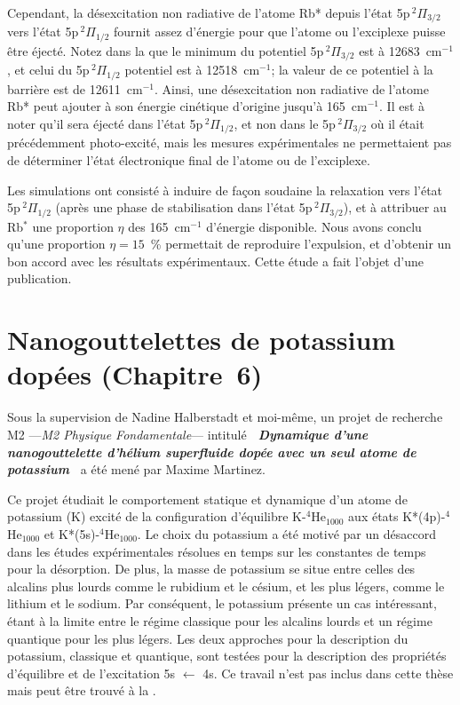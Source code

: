 		Cependant,  la désexcitation non radiative de l'atome Rb*  depuis l'état 5p$\,^2\Pi_{3/2}$ vers l'état 5p$\,^2\Pi_{1/2}$ fournit assez d'énergie pour que l'atome ou l'exciplexe puisse être éjecté. 
		Notez dans la  que le minimum du potentiel 5p$\,^2\Pi_{3/2}$ est à 12683~cm$^{-1}$, et celui du 5p$\,^2\Pi_{1/2}$ potentiel est à 12518~cm$^{-1}$; la valeur de ce potentiel à la barrière est de 12611~cm$^{-1}$. 
		Ainsi, une désexcitation non radiative de l'atome Rb* peut ajouter à son énergie cinétique d'origine jusqu'à 165~cm$^{-1}$. 
		Il est à noter qu'il sera éjecté dans l'état 5p$\,^2\Pi_{1/2}$, et non dans le 5p$\,^2\Pi_{3/2}$ où il était précédemment photo-excité, mais les mesures expérimentales ne permettaient pas de déterminer l'état électronique final de l'atome ou de l'exciplexe.
		
		Les simulations ont consisté à induire de façon soudaine la relaxation vers l'état 5p$\,^2\Pi_{1/2}$ (après une phase de stabilisation dans l'état 5p$\,^2\Pi_{3/2}$), et à attribuer au Rb$^*$ une proportion $\eta$ des 165~cm$^{-1}$ d'énergie disponible.
		Nous avons conclu qu'une proportion $\eta=15$~\% permettait de reproduire l'expulsion, et d'obtenir un bon accord avec les résultats expérimentaux.
		Cette étude a fait l'objet d'une publication.

	\section*{Nanogouttelettes de potassium dopées \small{(Chapitre~6)}}
		Sous la supervision de Nadine Halberstadt et moi-même, un projet de recherche M2  ---\emph{M2 Physique Fondamentale}--- intitulé \emph{\textbf{\guillemotleft~Dynamique d'une nanogouttelette d'hélium superfluide dopée avec un seul atome de potassium~\guillemotright}} a été mené par Maxime Martinez.
		
		Ce projet étudiait le comportement statique et dynamique d'un atome de potassium (K) excité de la configuration d'équilibre K-$^4$He$_{1000}$ aux états K*(4p)-$^4$He$_{1000}$ et K*(5s)-$^4$He$_{1000}$. 
		Le choix du potassium a été motivé par un désaccord dans les études expérimentales résolues en temps\citep{Schulz2001,Reho2000-1,Reho2000-2} sur les constantes de temps pour la désorption. 
		De plus, la masse de potassium se situe entre celles des alcalins plus lourds comme le rubidium et le césium, et les plus légers, comme le lithium et le sodium. 
		Par conséquent, le potassium présente un cas intéressant, étant à la limite entre le régime classique pour les alcalins lourds et un régime quantique pour les plus légers. 
		Les deux approches pour la description du potassium, classique et quantique, sont testées pour la description des propriétés d'équilibre et de l'excitation 5s $\leftarrow$ 4s. 
		Ce travail n'est pas inclus dans cette thèse mais peut être trouvé à la .
		
